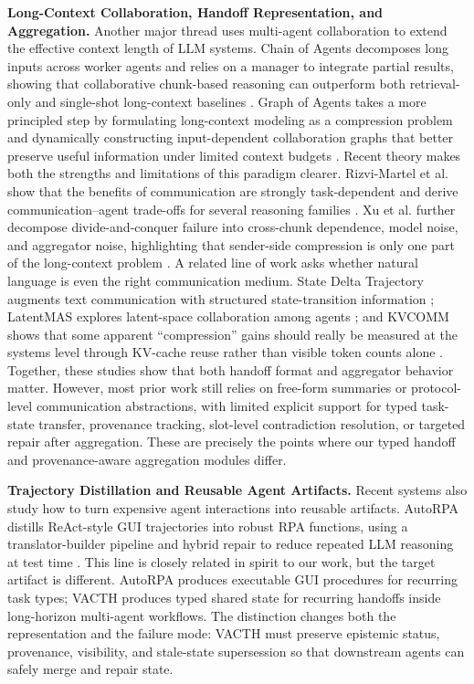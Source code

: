 \documentclass{article} %
\begin{document}
\textbf{Long-Context Collaboration, Handoff Representation, and Aggregation.}
Another major thread uses multi-agent collaboration to extend the effective context length of LLM systems. Chain of Agents decomposes long inputs across worker agents and relies on a manager to integrate partial results, showing that collaborative chunk-based reasoning can outperform both retrieval-only and single-shot long-context baselines \cite{zhang2024chainofagents}. Graph of Agents takes a more principled step by formulating long-context modeling as a compression problem and dynamically constructing input-dependent collaboration graphs that better preserve useful information under limited context budgets \cite{joo2025graphofagents}. Recent theory makes both the strengths and limitations of this paradigm clearer. Rizvi-Martel et al. show that the benefits of communication are strongly task-dependent and derive communication--agent trade-offs for several reasoning families \cite{rizvimartel2026benefits}. Xu et al. further decompose divide-and-conquer failure into cross-chunk dependence, model noise, and aggregator noise, highlighting that sender-side compression is only one part of the long-context problem \cite{xu2026divideconquer}. A related line of work asks whether natural language is even the right communication medium. State Delta Trajectory augments text communication with structured state-transition information \cite{tang2025sde}; LatentMAS explores latent-space collaboration among agents \cite{zou2025latentmas}; and KVCOMM shows that some apparent ``compression'' gains should really be measured at the systems level through KV-cache reuse rather than visible token counts alone \cite{ye2025kvcomm}. Together, these studies show that both handoff format and aggregator behavior matter. However, most prior work still relies on free-form summaries or protocol-level communication abstractions, with limited explicit support for typed task-state transfer, provenance tracking, slot-level contradiction resolution, or targeted repair after aggregation. These are precisely the points where our typed handoff and provenance-aware aggregation modules differ.

\textbf{Trajectory Distillation and Reusable Agent Artifacts.}
Recent systems also study how to turn expensive agent interactions into reusable artifacts. AutoRPA distills ReAct-style GUI trajectories into robust RPA functions, using a translator-builder pipeline and hybrid repair to reduce repeated LLM reasoning at test time \cite{chen2026autorpa}. This line is closely related in spirit to our work, but the target artifact is different. AutoRPA produces executable GUI procedures for recurring task types; VACTH produces typed shared state for recurring handoffs inside long-horizon multi-agent workflows. The distinction changes both the representation and the failure mode: VACTH must preserve epistemic status, provenance, visibility, and stale-state supersession so that downstream agents can safely merge and repair state.
\end{document}
